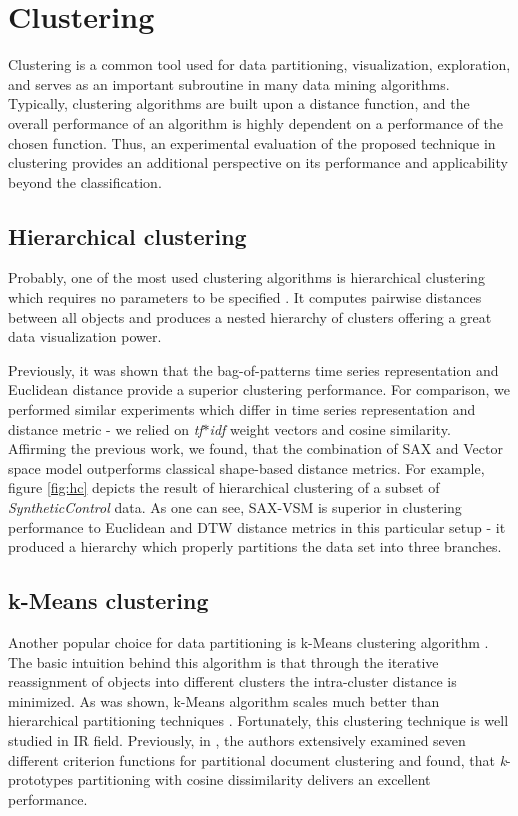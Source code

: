 \section{Clustering}
Clustering is a common tool used for data partitioning, visualization, exploration, and serves as
an important subroutine in many data mining algorithms. Typically, clustering algorithms
are built upon a distance function, and the overall performance of an algorithm is highly
dependent on a performance of the chosen function. Thus, an experimental evaluation of the 
proposed technique in clustering provides an additional perspective on its performance and
applicability beyond the classification.

\subsection{Hierarchical clustering}
Probably, one of the most used clustering algorithms is hierarchical clustering which requires no
parameters to be specified \cite{citeulike:1576606}. It computes pairwise distances between all objects and 
produces a nested hierarchy of clusters offering a great data visualization power. 

Previously, it was shown that the bag-of-patterns time series representation and Euclidean distance
provide a superior clustering performance\cite{citeulike:10525778}. 
For comparison, we performed similar experiments which differ in time series representation and
distance metric - we relied on \textit{tf$\ast$idf} weight vectors and cosine similarity. 
Affirming the previous work, we found, that the combination of SAX and Vector space model
outperforms classical shape-based distance metrics. 
For example, figure \ref{fig:hc} depicts the result of hierarchical clustering of a subset of
\textit{SyntheticControl} data. 
As one can see, SAX-VSM is superior in clustering performance to Euclidean and DTW distance 
metrics in this particular setup - it produced a hierarchy which properly partitions the
data set into three branches.

\subsection{k-Means clustering}
Another popular choice for data partitioning is k-Means clustering algorithm \cite{kmeans}.
The basic intuition behind this algorithm is that through the iterative reassignment of objects 
into different clusters the intra-cluster distance is minimized. As was shown, k-Means 
algorithm scales much better than hierarchical partitioning techniques \cite{citeulike:4195343}.
Fortunately, this clustering technique is well studied in IR field. Previously, in \cite{citeulike:505248}, the
authors extensively examined seven different criterion functions for partitional document
clustering and found, that \textit{k}-prototypes partitioning with cosine dissimilarity delivers an
excellent performance. 

